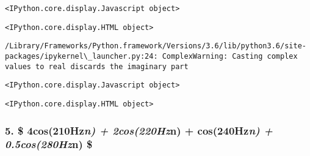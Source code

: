 \documentclass[11pt]{article}
\begin{document}
    
    \begin{verbatim}
<IPython.core.display.Javascript object>
    \end{verbatim}

    
    
    \begin{verbatim}
<IPython.core.display.HTML object>
    \end{verbatim}

    
    \begin{Verbatim}[commandchars=\\\{\}]
/Library/Frameworks/Python.framework/Versions/3.6/lib/python3.6/site-packages/ipykernel\_launcher.py:24: ComplexWarning: Casting complex values to real discards the imaginary part

    \end{Verbatim}

    
    \begin{verbatim}
<IPython.core.display.Javascript object>
    \end{verbatim}

    
    
    \begin{verbatim}
<IPython.core.display.HTML object>
    \end{verbatim}

    
    \hypertarget{cos210hzn-2cos220hzn-cos240hzn-0.5cos280hzn}{%
\subsubsection{\texorpdfstring{5. \$ 4cos(2\pi*10Hz\emph{n) +
2cos(2\pi*20Hz}n) + cos(2\pi*40Hz\emph{n) + 0.5cos(2\pi*80Hz}n)
\$}{5. \$ 4cos(210Hzn) + 2cos(220Hzn) + cos(240Hzn) + 0.5cos(280Hzn) \$}}\label{cos210hzn-2cos220hzn-cos240hzn-0.5cos280hzn}}
\end{document}
